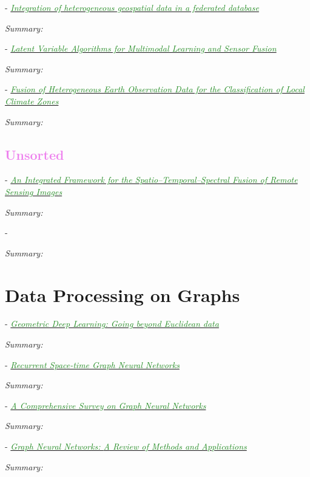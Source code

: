 \documentclass[]{article}
\newcommand{\paperentry}[4]{
            \hangindent=1cm
            \textcolor{red}{\cite{#1}} - \href{run:../References/#3}{\textcolor{ForestGreen}{\textit{#2}}}
            
            \noindent            
            \begin{minipage}[t]{0.1\linewidth}\hfill\end{minipage}
            \begin{minipage}[t]{0.8\linewidth}\textcolor{NavyBlue}{{\textit{Summary:}}}#4\end{minipage}
            \vspace{.25cm}
          }
\begin{document}
		\paperentry{Butenuth2007HeterogeneousGeospatialData}
		{Integration of heterogeneous geospatial data in a federated database}
		{Fusion/Butenuth2007HeterogeneousGeospatialData.pdf}
		{}
		
			
		\paperentry{Guo2019LVAforMultimodalLearningandSensorFusion}
		{Latent Variable Algorithms for Multimodal Learning and Sensor Fusion}
		{Fusion/Guo2019LVAforMultimodalLearningandSensorFusion.pdf}
		{}
		
		\paperentry{Zhang2019FusionHeteroEarthObsClimateZones}
		{Fusion of Heterogeneous Earth Observation Data for the Classification of Local Climate Zones}
		{Fusion/Zhang2019FusionHeteroEarthObsClimateZones.pdf}
		{}
	
	\textcolor{Violet}{\subsection{Unsorted}}
	
	\paperentry{Shen2016SpatioTemporalSpectralFusion}
	{An Integrated Framework for the Spatio–Temporal–Spectral Fusion of Remote Sensing Images}
	{Fusion/Shen2016SpatioTemporalSpectralFusion.pdf}
	{}
	
	
	\paperentry{}
	{}
	{}
	{}
	
\section{Data Processing on Graphs}	

\paperentry{Bronstein2017GeometricDeepLearning}
{Geometric Deep Learning: Going beyond Euclidean data}
{Manifold_Representation_Learning/NeuralNets/Bronstein2017GeometricDeepLearning.pdf}
{}

\paperentry{Nicolicioiu2019RecurrentSpaceTimeGraphNN}
{Recurrent Space-time Graph Neural Networks}
{Manifold_Representation_Learning/NeuralNets/Nicolicioiu2019RecurrentSpaceTimeGraphNN.pdf}
{}

\paperentry{Wu2019SurveyGraphConvolutionalNeuralNetworks}
{A Comprehensive Survey on Graph Neural Networks}
{Manifold_Representation_Learning/NeuralNets/Wu2019SurveyGraphConvolutionalNeuralNetworks.pdf}
{}

\paperentry{Zhou2019ReviewGraphNeuralNetworks}
{Graph Neural Networks: {A} Review of Methods and Applications}
{Manifold_Representation_Learning/NeuralNets/Zhou2019ReviewGraphNeuralNetworks.pdf}
{}

\end{document}
